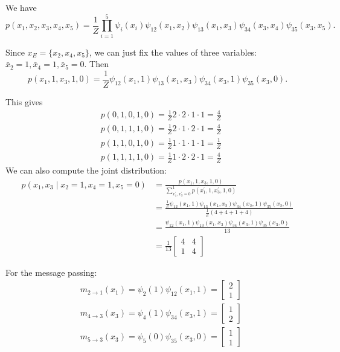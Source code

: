 We have
$$
p\left(x_1, x_2, x_3, x_4, x_5\right)=\frac{1}{Z} \prod_{i=1}^5 \psi_i\left(x_i\right) \psi_{12}\left(x_1, x_2\right) \psi_{13}\left(x_1, x_3\right) \psi_{34}\left(x_3, x_4\right) \psi_{35}\left(x_3, x_5\right) .
$$

Since $x_E=\{x_2,x_4,x_5\}$, we can just fix the values of three variables: $\bar{x}_2=1, \bar{x}_4=1, \bar{x}_5=0$. Then
$$
p\left(x_1, 1, x_3, 1,0\right)=\frac{1}{Z} \psi_{12}\left(x_1, 1\right) \psi_{13}\left(x_1, x_3\right) \psi_{34}\left(x_3, 1\right) \psi_{35}\left(x_3, 0\right) .
$$

This gives
$$
\begin{aligned}
& p(0,1,0,1,0)=\frac{1}{Z} 2 \cdot 2 \cdot 1 \cdot 1=\frac{4}{Z} \\
& p(0,1,1,1,0)=\frac{1}{Z} 2 \cdot 1 \cdot 2 \cdot 1=\frac{4}{Z} \\
& p(1,1,0,1,0)=\frac{1}{Z} 1 \cdot 1 \cdot 1 \cdot 1=\frac{1}{Z} \\
& p(1,1,1,1,0)=\frac{1}{Z} 1 \cdot 2 \cdot 2 \cdot 1=\frac{4}{Z}
\end{aligned}
$$
We can also compute the joint distribution:
\begin{align*}
    p\left(x_1, x_3 \mid x_2=1, x_4=1, x_5=0\right) & =\frac{p\left(x_1, 1, x_3, 1,0\right)}{\sum_{x_1^{\prime}, x_3^{\prime}=0}^1 p\left(x_1^{\prime}, 1, x_3^{\prime}, 1,0\right)} \\
    & =\frac{\frac{1}{Z} \psi_{12}\left(x_1, 1\right) \psi_{13}\left(x_1, x_3\right) \psi_{34}\left(x_3, 1\right) \psi_{35}\left(x_3, 0\right)}{\frac{1}{Z}(4+4+1+4)} \\
    & =\frac{\psi_{12}\left(x_1, 1\right) \psi_{13}\left(x_1, x_3\right) \psi_{34}\left(x_3, 1\right) \psi_{35}\left(x_3, 0\right)}{13} \\
    & =\frac{1}{13}\left[\begin{array}{cc}
    4 & 4 \\
    1 & 4
    \end{array}\right]
\end{align*}

For the message passing:
$$
\begin{aligned}
& m_{2 \rightarrow 1}\left(x_1\right)=\psi_2(1) \psi_{12}\left(x_1, 1\right)=\left[\begin{array}{l}
2 \\
1
\end{array}\right] \\
& m_{4 \rightarrow 3}\left(x_3\right)=\psi_4(1) \psi_{34}\left(x_3, 1\right)=\left[\begin{array}{l}
1 \\
2
\end{array}\right] \\
& m_{5 \rightarrow 3}\left(x_3\right)=\psi_5(0) \psi_{35}\left(x_3, 0\right)=\left[\begin{array}{l}
1 \\
1
\end{array}\right]
\end{aligned}
$$

